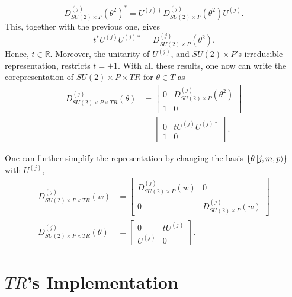 \documentclass[12pt]{revtex4-2}
\begin{document}
\begin{equation}
    D^{(j)}_{SU(2)\times P}(\theta^{2})^\ast = U^{(j)\dagger}D^{(j)}_{SU(2)\times P}(\theta^{2})U^{(j)}.
\end{equation}
This, together with the previous one, gives
\begin{equation}
    t^\ast U^{(j)}U^{(j)\ast} = D^{(j)}_{SU(2)\times P}(\theta^{2}).
\end{equation}
Hence, $t\in\mathbb{R}$. Moreover, the unitarity of $U^{(j)}$, and $SU(2)\times P$'s 
irreducible representation, restricts $t = \pm 1$. With all these results, one now
can write the corepresentation of $SU(2)\times P\times TR$ for $\theta\in T$ as
\begin{equation}
    \begin{aligned}
        D_{SU(2)\times P\times TR}^{(j)}(\theta) &= 
        \begin{bmatrix}
            0 & D^{(j)}_{SU(2)\times P}(\theta^2) \\
            1 & 0
        \end{bmatrix} \\
        &= \begin{bmatrix}
            0 & t U^{(j)}U^{(j)\ast} \\
            1 & 0
        \end{bmatrix}.
    \end{aligned}
\end{equation}

One can further simplify the representation by changing the basis $\{\theta\ket{j, m, p}\}$ with $U^{(j)}$,
\begin{equation}
    \begin{aligned}
        D_{SU(2)\times P\times TR}^{(j)}(w) &= 
        \begin{bmatrix}
            D^{(j)}_{SU(2)\times P}(w) & 0 \\
            0 & D^{(j)}_{SU(2)\times P}(w)
        \end{bmatrix} \\
        D_{SU(2)\times P\times TR}^{(j)}(\theta) &= 
        \begin{bmatrix}
            0 & t U^{(j)} \\
            U^{(j)} & 0
        \end{bmatrix}.
    \end{aligned}
\end{equation}

\section{$TR$'s Implementation}
\end{document}

